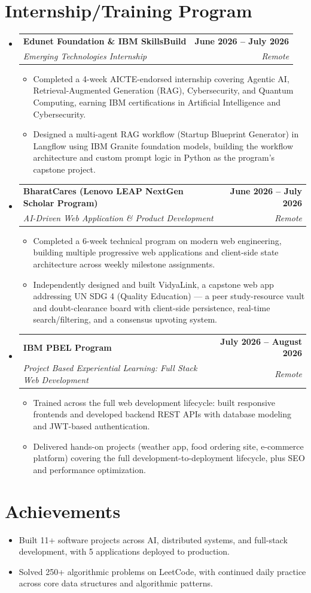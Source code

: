 \documentclass[letterpaper,10pt]{article}
\makeatletter
\newcommand{\resumeItem}[1]{
  \item\small{
    {#1 \vspace{-2pt}}
  }
}
\newcommand{\resumeSubheading}[4]{
  \vspace{-2pt}\item
    \begin{tabular*}{1.0\textwidth}[t]{l@{\extracolsep{\fill}}r}
      \textbf{#1} & \textbf{\small #2} \\
      \textit{\small#3} & \textit{\small #4} \\
    \end{tabular*}\vspace{-7pt}
}
\newcommand{\resumeSubHeadingListStart}{\begin{itemize}[leftmargin=0.0in, label={}]}
\newcommand{\resumeSubHeadingListEnd}{\end{itemize}}
\newcommand{\resumeItemListStart}{\begin{itemize}}
\newcommand{\resumeItemListEnd}{\end{itemize}\vspace{-5pt}}
\makeatother
\begin{document}
\section{Internship/Training Program}
  \resumeSubHeadingListStart
    \resumeSubheading
      {Edunet Foundation \& IBM SkillsBuild}{June 2026 -- July 2026}
      {Emerging Technologies Internship}{Remote}
      \resumeItemListStart
        \resumeItem{Completed a 4-week AICTE-endorsed internship covering Agentic AI, Retrieval-Augmented Generation (RAG), Cybersecurity, and Quantum Computing, earning IBM certifications in Artificial Intelligence and Cybersecurity.}
        \resumeItem{Designed a multi-agent RAG workflow (Startup Blueprint Generator) in Langflow using IBM Granite foundation models, building the workflow architecture and custom prompt logic in Python as the program's capstone project.}
      \resumeItemListEnd
    \resumeSubheading
      {BharatCares (Lenovo LEAP NextGen Scholar Program)}{June 2026 -- July 2026}
      {AI-Driven Web Application \& Product Development}{Remote}
      \resumeItemListStart
        \resumeItem{Completed a 6-week technical program on modern web engineering, building multiple progressive web applications and client-side state architecture across weekly milestone assignments.}
        \resumeItem{Independently designed and built VidyaLink, a capstone web app addressing UN SDG 4 (Quality Education) — a peer study-resource vault and doubt-clearance board with client-side persistence, real-time search/filtering, and a consensus upvoting system.}
      \resumeItemListEnd
    \resumeSubheading
      {IBM PBEL Program}{July 2026 -- August 2026}
      {Project Based Experiential Learning: Full Stack Web Development}{Remote}
      \resumeItemListStart
        \resumeItem{Trained across the full web development lifecycle: built responsive frontends and developed backend REST APIs with database modeling and JWT-based authentication.}
        \resumeItem{Delivered hands-on projects (weather app, food ordering site, e-commerce platform) covering the full development-to-deployment lifecycle, plus SEO and performance optimization.}
      \resumeItemListEnd
  \resumeSubHeadingListEnd
\vspace{-12pt}

\section{Achievements}
      \resumeItemListStart
\resumeItem{Built 11+ software projects across AI, distributed systems, and full-stack development, with 5 applications deployed to production.}
  \vspace{-16pt}
\resumeItem{Solved 250+ algorithmic problems on LeetCode, with continued daily practice across core data structures and algorithmic patterns.}
     \resumeItemListEnd
\end{document}
